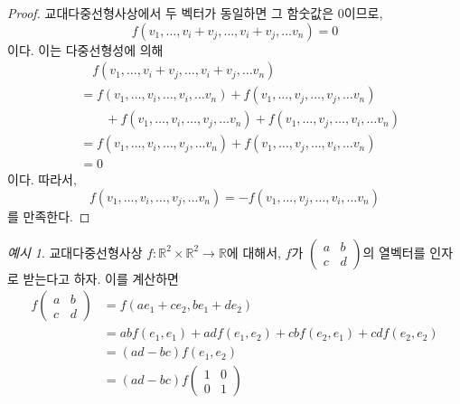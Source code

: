 \documentclass[unfonts,oneside,a4paper]{oblivoir}
\theoremstyle{definition}
\theoremstyle{theorem}
\theoremstyle{theorem}
\theoremstyle{remark}
\theoremstyle{remark}
\theoremstyle{remark}
\newtheorem*{example}{예시}
\theoremstyle{remark}
\renewcommand{\vec}[1]{\bm{\mathit{#1}}}
\begin{document}
\begin{proof}
    교대다중선형사상에서 두 벡터가 동일하면 그 함숫값은 0이므로,
    \begin{equation*}
        f(\vec v_1, \dots, \vec v_i + \vec v_j, \dots, \vec v_i + \vec v_j, \dots \vec v_n) = 0
    \end{equation*}
    이다.
    이는 다중선형성에 의해
    \begin{align*}
        &\quad f(\vec v_1, \dots, \vec v_i + \vec v_j, \dots, \vec v_i + \vec v_j, \dots \vec v_n)\\
        &= f(\vec v_1, \dots, \vec v_i, \dots, \vec v_i, \dots \vec v_n) + f(\vec v_1, \dots, \vec v_j, \dots, \vec v_j, \dots \vec v_n)\\
        &\qquad+ f(\vec v_1, \dots, \vec v_i, \dots, \vec v_j, \dots \vec v_n) + f(\vec v_1, \dots, \vec v_j, \dots, \vec v_i, \dots \vec v_n)\\
        &= f(\vec v_1, \dots, \vec v_i, \dots, \vec v_j, \dots \vec v_n) + f(\vec v_1, \dots, \vec v_j, \dots, \vec v_i, \dots \vec v_n)\\
        &= 0
    \end{align*}
    이다.
    따라서,
    \begin{equation*}
        f(\vec v_1, \dots, \vec v_i, \dots, \vec v_j, \dots \vec v_n) = -f(\vec v_1, \dots, \vec v_j, \dots, \vec v_i, \dots \vec v_n)
    \end{equation*}
    를 만족한다.
\end{proof}

\begin{example}
    교대다중선형사상 $f: \mathbb R^2 \times \mathbb R^2 \rightarrow \mathbb R$에 대해서, $f$가 $\begin{pmatrix}a & b \\ c & d\end{pmatrix}$의 열벡터를 인자로 받는다고 하자.
    이를 계산하면
    \begin{align*}
        f
        \begin{pmatrix}
            a & b\\
            c & d
        \end{pmatrix}
        &= f(a \vec e_1 + c \vec e_2, b \vec e_1 + d \vec e_2)\\
        &= ab f(\vec e_1, \vec e_1) + ad f(\vec e_1, \vec e_2) + cb f(\vec e_2, \vec e_1) + cd f(\vec e_2, \vec e_2)\\
        &= (ad - bc) f(\vec e_1, \vec e_2)\\
        &= (ad - bc) f
        \begin{pmatrix}
            1 & 0\\
            0 & 1
        \end{pmatrix}
    \end{align*}
\end{example}
\end{document}
